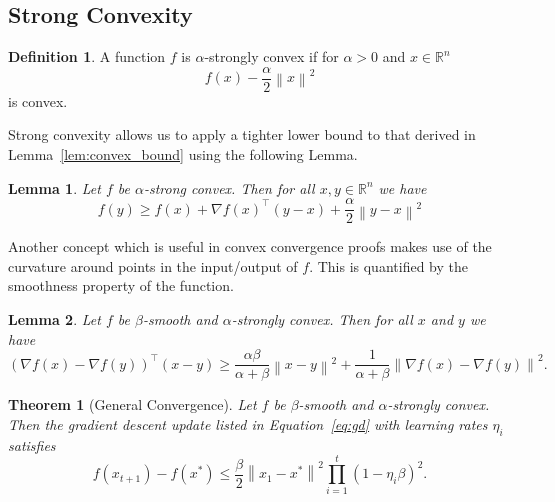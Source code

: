 \documentclass{article}
\newcommand{\R}{\mathbb R}
\newcommand{\norm}[1]{\left\| #1 \right\| }
\newtheorem{lemma}{Lemma}
\newtheorem{theorem}{Theorem}
\theoremstyle{definition}
\newtheorem{definition}{Definition}
\begin{document}
\subsection{Strong Convexity}

\begin{definition}
    A function $f$ is $\alpha$-strongly convex if for $\alpha > 0$ and $x \in
    \R^n$
    \begin{equation}
        f(x) - \frac{\alpha}{2}\norm{x}^2   
    \end{equation}
    is convex.
\end{definition}

Strong convexity allows us to apply a tighter lower bound to that derived in
Lemma~\ref{lem:convex_bound} using the following Lemma.

\begin{lemma}
    Let $f$ be $\alpha$-strong convex. Then for all $x, y \in \R^n$ we have 
    \begin{equation}
        f(y) \geq f(x) + \nabla {f(x)}^\intercal(y - x) + \frac{\alpha}{2}
        \norm{y - x}^2
    \end{equation}
\end{lemma}

Another concept which is useful in convex convergence proofs makes use of the
curvature around points in the input/output of $f$. This is quantified by the
smoothness property of the function.


\begin{lemma}
    Let $f$ be $\beta$-smooth and $\alpha$-strongly convex. Then for all $x$ and
    $y$ we have
    \begin{equation}
        {(\nabla f(x) - \nabla f(y))}^\intercal (x - y) \geq
        \frac{\alpha\beta}{\alpha + \beta} \norm{x - y}^2 + \frac{1}{\alpha +
        \beta} \norm{\nabla f(x) - \nabla f(y)}^2.
    \end{equation}
\end{lemma}

\begin{theorem}[General Convergence]
    Let $f$ be $\beta$-smooth  and $\alpha$-strongly convex. Then the
    gradient descent update listed in Equation~\ref{eq:gd} with learning rates
    $\eta_i$ satisfies
    \begin{equation}
        f(x_{t+1}) - f(x^*) \leq \frac{\beta}{2} \norm{x_1 - x^*}^2\prod_{i = 1}^t {\left( 1 - \eta_i \beta
        \right)}^{2} .
    \end{equation}
\end{theorem}
\end{document}
